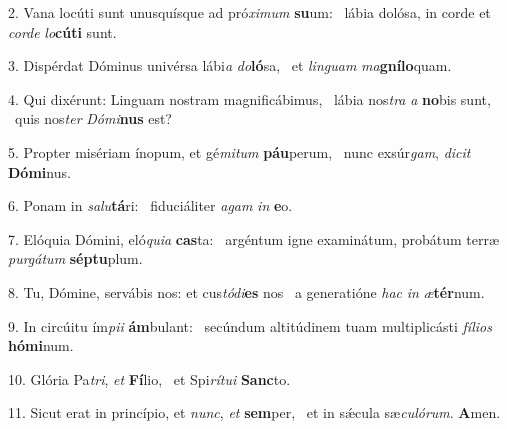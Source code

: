 2. Vana locúti sunt unusquísque ad pró\textit{xi}\textit{mum} \textbf{su}um: \ast\  lábia dolósa, in corde et \textit{cor}\textit{de} \textit{lo}\textbf{cú}\textbf{ti} sunt.\

3. Dispérdat Dóminus univérsa lábi\textit{a} \textit{do}\textbf{ló}sa, \ast\  et \textit{lin}\textit{guam} \textit{ma}\textbf{gní}\textbf{lo}quam.\

4. Qui dixérunt: Linguam nostram magnificábimus, \dag\  lábia nos\textit{tra} \textit{a} \textbf{no}bis sunt, \ast\  quis nos\textit{ter} \textit{Dó}\textit{mi}\textbf{nus} est?\

5. Propter misériam ínopum, et gé\textit{mi}\textit{tum} \textbf{páu}perum, \ast\  nunc exsúr\textit{gam}, \textit{di}\textit{cit} \textbf{Dó}\textbf{mi}nus.\

6. Ponam in \textit{sa}\textit{lu}\textbf{tá}ri: \ast\  fiduciáliter \textit{a}\textit{gam} \textit{in} \textbf{e}o.\

7. Elóquia Dómini, eló\textit{qui}\textit{a} \textbf{cas}ta: \ast\  argéntum igne examinátum, probátum terræ \textit{pur}\textit{gá}\textit{tum} \textbf{sép}\textbf{tu}plum.\

8. Tu, Dómine, servábis nos: et cus\textit{tó}\textit{di}\textbf{es} nos \ast\  a generatióne \textit{hac} \textit{in} \textit{æ}\textbf{tér}num.\

9. In circúitu ím\textit{pi}\textit{i} \textbf{ám}bulant: \ast\  secúndum altitúdinem tuam multiplicásti \textit{fí}\textit{li}\textit{os} \textbf{hó}\textbf{mi}num.\

10. Glória Pa\textit{tri}, \textit{et} \textbf{Fí}lio, \ast\  et Spi\textit{rí}\textit{tu}\textit{i} \textbf{Sanc}to.\

11. Sicut erat in princípio, et \textit{nunc}, \textit{et} \textbf{sem}per, \ast\  et in sǽcula sæ\textit{cu}\textit{ló}\textit{rum}. \textbf{A}men.\

